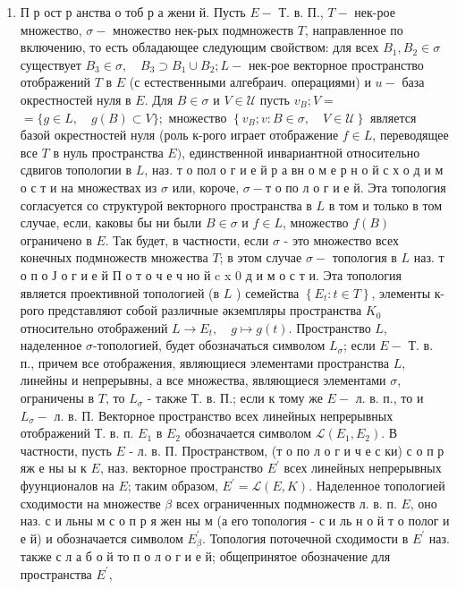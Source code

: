 \documentclass[10pt]{article}
\begin{document}
\begin{enumerate}
векторное пространство $\cup\left\{D_{K}\right.$ : $K \subset \Omega\}$, наделенное индуктивной топологией семейства л. в. П. $\left\{D_{K}: K \subset \Omega\right\}$ относительно канонич. вложений $D_{K} \rightarrow D_{\Omega}$. Л. в. П. $D(\Omega)$ (также играющее важную роль в теории обобщенных функций) полно, сепарабельно, неметризуемо; оно финально компактно и потому паракомпактно и, следовательно, нормально. Л. в. п. $D(\Omega)$ обладает неполным метризуемым факторпространством [11].



  \item П р ост р анства о тоб р а жени й. Пусть $E-$ Т. в. П., $T-$ нек-рое множество, $\sigma-$ множество нек-рых подмножеств $T$, направленное по включению, то есть обладающее следующим свойством: для всех $B_{1}, B_{2} \in \sigma$ существует $B_{3} \in \sigma, \quad B_{3} \supset B_{1} \cup B_{2} ; L-$ нек-рое векторное пространство отображений $T$ в $E$ (с естественными алгебраич. операциями) и $u-$ база окрестностей нуля в $E$. Для $B \in \sigma$ и $V \in \mathcal{U}$ пусть $v_{B} ; V=$ $=\{g \in L, \quad g(B) \subset V\} ;$ множество $\left\{v_{B} ; v: B \in \sigma, \quad V \in \mathcal{U}\right\}$ является базой окрестностей нуля (роль к-рого играет отображение $f \in L$, переводящее все $T$ в нуль пространства $E)$, единственной инвариантной относительно сдвигов топологии в $L$, наз. т о пол о г и е й р а вн о м е р н о й с х о д и м о с т и на множествах из $\sigma$ или, короче, $\sigma-т$ о по л о г и е й. Эта топология согласуется со структурой векторного пространства в $L$ в том и только в том случае, если, каковы бы ни были $B \in \sigma$ и $f \in L$, множество $f(B)$ ограничено в $E$. Так будет, в частности, если $\sigma$ - это множество всех конечных подмножеств множества $T$; в этом случае $\sigma-$ топология в $L$ наз. т о п о Ј о г и е й П о т о ч е ч но й c x 0 д и м о с т и. Эта топология является проективной топологией (в $L$ ) семейства $\left\{E_{t}: t \in T\right\}$, элементы к-рого представляют собой различные әкземпляры пространства $K_{0}$ относительно отображений $L \rightarrow E_{t}, \quad g \mapsto g(t)$. Пространство $L$, наделенное $\sigma$-топологией, будет обозначаться символом $L_{\sigma}$; если $E-$ Т. в. п., причем все отображения, являющиеся элементами пространства $L$, линейны и непрерывны, а все множества, являющиеся элементами $\sigma$, ограничены в $T$, то $L_{\sigma}$ - также Т. в. П.; если к тому же $E-$ л. в. п., то и $L_{\sigma}-$ л. в. П. Векторное пространство всех линейных непрерывных отображений Т. в. п. $E_{1}$ в $E_{2}$ обозначается символом $\mathscr{L}\left(E_{1}, E_{2}\right)$. В частности, пусть $E$ - л. в. П. Пространством, (т о по л о г и ч е с ки) с о п р яж е ны ы к $E$, наз. векторное пространство $E^{\prime}$ всех линейных непрерывных фуунционалов на $E$; таким образом, $E^{\prime}=\mathscr{L}(E, K)$. Наделенное топологией сходимости на множестве $\beta$ всех ограниченных подмножеств л. в. п. $E$, оно наз. с и льны м с о п р я жен ны м (а его топология - с и ль н о й т о полог и е й) и обозначается символом $E_{\beta}^{\prime}$. Топология поточечной сходимости в $E^{\prime}$ наз. также с л а б о й то п о л о г и е й; общепринятое обозначение для пространства $E^{\prime}$, 
\end{enumerate}
\end{document}
